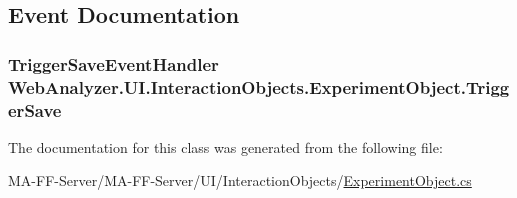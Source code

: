 \subsection{Event Documentation}
\hypertarget{class_web_analyzer_1_1_u_i_1_1_interaction_objects_1_1_experiment_object_a650d83ab59dbf1753939130f39bf27fa}{}
\subsubsection[{Trigger\+Save}]{\setlength{\rightskip}{0pt plus 5cm}Trigger\+Save\+Event\+Handler Web\+Analyzer.\+U\+I.\+Interaction\+Objects.\+Experiment\+Object.\+Trigger\+Save}\label{class_web_analyzer_1_1_u_i_1_1_interaction_objects_1_1_experiment_object_a650d83ab59dbf1753939130f39bf27fa}


The documentation for this class was generated from the following file\+:\begin{DoxyCompactItemize}
\item 
M\+A-\/\+F\+F-\/\+Server/\+M\+A-\/\+F\+F-\/\+Server/\+U\+I/\+Interaction\+Objects/\hyperlink{_experiment_object_8cs}{Experiment\+Object.\+cs}\end{DoxyCompactItemize}

